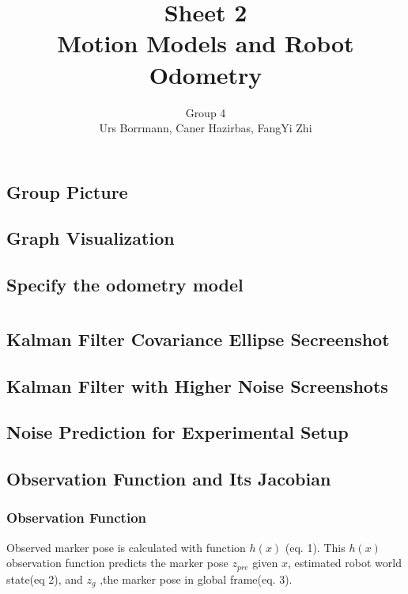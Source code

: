 \documentclass[14pt,a4paper]{article}
\title{\textbf{Sheet 2} \\  \textbf{Motion Models and Robot Odometry}}
\author{Group 4 \\Urs Borrmann, Caner Hazirbas, FangYi Zhi}
\begin{document}
\maketitle
\onehalfspacing

\section{}
	\subsection{Group Picture}


	\subsection{Graph Visualization}


	\subsection{Specify the odometry model}


\section{}
	\subsection{Kalman Filter Covariance Ellipse Secreenshot}
		

	\subsection{Kalman Filter with Higher Noise Screenshots}
	\subsection{Noise Prediction for Experimental Setup}	
	
	\subsection{Observation Function and Its Jacobian}
		\subsubsection{Observation Function}
	 	Observed marker pose is calculated with function $h(x)$ (eq. 1). This $h(x)$ observation function predicts the marker pose $z_{pre}$ given $x$, estimated robot world state(eq 2), and $z_{g}$ ,the marker pose in global frame(eq. 3).
		 
\end{document}
